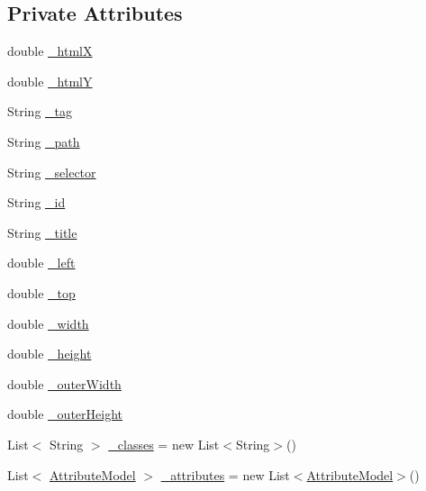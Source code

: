 \subsection*{Private Attributes}
\begin{DoxyCompactItemize}
\item 
double \hyperlink{class_web_analyzer_1_1_models_1_1_data_model_1_1_d_o_m_element_model_a8c54222edebcf6248dc410d83bc2dccb}{\+\_\+html\+X}
\item 
double \hyperlink{class_web_analyzer_1_1_models_1_1_data_model_1_1_d_o_m_element_model_ac6d9264bac06b6653533e492138e8160}{\+\_\+html\+Y}
\item 
String \hyperlink{class_web_analyzer_1_1_models_1_1_data_model_1_1_d_o_m_element_model_a189cb52ec2fbbc5d2fad73187ffa9404}{\+\_\+tag}
\item 
String \hyperlink{class_web_analyzer_1_1_models_1_1_data_model_1_1_d_o_m_element_model_adcfc13a3bc75b3efb29b7328115d2996}{\+\_\+path}
\item 
String \hyperlink{class_web_analyzer_1_1_models_1_1_data_model_1_1_d_o_m_element_model_a1fba31f038cfcd20e7be095aa736695a}{\+\_\+selector}
\item 
String \hyperlink{class_web_analyzer_1_1_models_1_1_data_model_1_1_d_o_m_element_model_a4f824d5be5dd68766e0a50d5f27a8dfc}{\+\_\+id}
\item 
String \hyperlink{class_web_analyzer_1_1_models_1_1_data_model_1_1_d_o_m_element_model_a1f78ca7c25fcb00ee45f23482ae92c3a}{\+\_\+title}
\item 
double \hyperlink{class_web_analyzer_1_1_models_1_1_data_model_1_1_d_o_m_element_model_aeb026965e7f90ea485c57b8b78d019b0}{\+\_\+left}
\item 
double \hyperlink{class_web_analyzer_1_1_models_1_1_data_model_1_1_d_o_m_element_model_a2375d70647ec50aa1a497e9e9ab6aade}{\+\_\+top}
\item 
double \hyperlink{class_web_analyzer_1_1_models_1_1_data_model_1_1_d_o_m_element_model_ad89c6f97d80115d398e26e76eb2ab7b7}{\+\_\+width}
\item 
double \hyperlink{class_web_analyzer_1_1_models_1_1_data_model_1_1_d_o_m_element_model_a271887d24b632402d029618d0a208cfe}{\+\_\+height}
\item 
double \hyperlink{class_web_analyzer_1_1_models_1_1_data_model_1_1_d_o_m_element_model_a4812f06ca8225b4386f5e5ea45370550}{\+\_\+outer\+Width}
\item 
double \hyperlink{class_web_analyzer_1_1_models_1_1_data_model_1_1_d_o_m_element_model_a4d8c5283f4625e042bb2a98cdec323ce}{\+\_\+outer\+Height}
\item 
List$<$ String $>$ \hyperlink{class_web_analyzer_1_1_models_1_1_data_model_1_1_d_o_m_element_model_a6df986d1bb481e6aba1ab17c5f6c2fce}{\+\_\+classes} = new List$<$String$>$()
\item 
List$<$ \hyperlink{class_web_analyzer_1_1_models_1_1_data_model_1_1_attribute_model}{Attribute\+Model} $>$ \hyperlink{class_web_analyzer_1_1_models_1_1_data_model_1_1_d_o_m_element_model_ac907634afc4fec9be436d2ad08865246}{\+\_\+attributes} = new List$<$\hyperlink{class_web_analyzer_1_1_models_1_1_data_model_1_1_attribute_model}{Attribute\+Model}$>$()
\end{DoxyCompactItemize}


